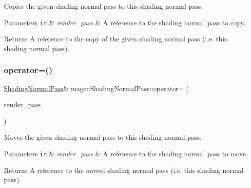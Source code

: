 Copies the given shading normal pass to this shading normal pass.


\begin{DoxyParams}[1]{Parameters}
\mbox{\tt in}  & {\em render\+\_\+pass} & A reference to the shading normal pass to copy. \\
\hline
\end{DoxyParams}
\begin{DoxyReturn}{Returns}
A reference to the copy of the given shading normal pass (i.\+e. this shading normal pass). 
\end{DoxyReturn}
\hypertarget{classmage_1_1_shading_normal_pass_a25a9ba6a32a246176929f4de1a4adf0c}{}\label{classmage_1_1_shading_normal_pass_a25a9ba6a32a246176929f4de1a4adf0c} 
\subsubsection{\texorpdfstring{operator=()}{operator=()}\hspace{0.1cm}{\footnotesize\ttfamily [2/2]}}
{\footnotesize\ttfamily \hyperlink{classmage_1_1_shading_normal_pass}{Shading\+Normal\+Pass}\& mage\+::\+Shading\+Normal\+Pass\+::operator= (\begin{DoxyParamCaption}\item[{\hyperlink{classmage_1_1_shading_normal_pass}{Shading\+Normal\+Pass} \&\&}]{render\+\_\+pass }\end{DoxyParamCaption})\hspace{0.3cm}{\ttfamily [delete]}}

Moves the given shading normal pass to this shading normal pass.


\begin{DoxyParams}[1]{Parameters}
\mbox{\tt in}  & {\em render\+\_\+pass} & A reference to the shading normal pass to move. \\
\hline
\end{DoxyParams}
\begin{DoxyReturn}{Returns}
A reference to the moved shading normal pass (i.\+e. this shading normal pass). 
\end{DoxyReturn}
\hypertarget{classmage_1_1_shading_normal_pass_a21f09077193e7b1dd50cd0968a66b6a6}{}\label{classmage_1_1_shading_normal_pass_a21f09077193e7b1dd50cd0968a66b6a6} 
